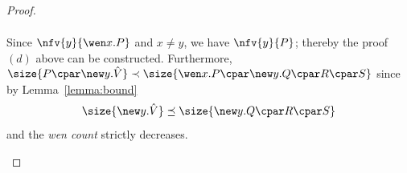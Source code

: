 \documentclass[UKenglish,acmsmall,authorversion]{acmart}
\newcommand{\fullproof}[1]{} %
\theoremstyle{plain}
\begin{document}
{\begin{proof}
\begin{enumerate}[label=\textbf{\Alph*},ref=\Alph*,leftmargin=*]
\begin{enumerate}[label*=\textbf{.\arabic*}]
\[\begin{array}{cccc}
\end{array}
\]
Since $\nfv{y}{\wen x. P}$ and $x \not= y$, we have $\nfv{y}{P}$;
thereby the proof $(d)$ above can be constructed.
Furthermore, $\size{ P \cpar \new y.\hat{V} } \prec \size{ \wen x. P \cpar \new y. Q \cpar R \cpar S }$ since by Lemma~\ref{lemma:bound} 
\[
\size{ \new y. \hat{V} } \preceq \size{\new y. Q \cpar R \cpar S}
\]
and the \textit{wen count} strictly decreases.
\end{enumerate}

\fullproof{
Consider the commutative case when the \textit{wen} quantifier commutes with another \textit{wen} quantifier at the root of the principal formula.
In this case, the bottommost rule of a proof is of the form $\wen x. P \cpar \wen y. Q \cpar R \cpar \infer[]{
S}{
 \mathopen{\wen y.} \left( \wen x. P \cpar Q \cpar R\right) \cpar S
}$, where $\nfv{y}{\wen x. P \cpar R}$ and $x \not= y$, where the second condition can be achieved by $\alpha$-conversion.
By the induction hypothesis, there exist $T$ and $U$ such that $\vdash \wen x. P \cpar Q \cpar R \cpar U$, $\nfv{y}{T}$ and either $T = U$ or $T = \new y. U$, and also
$\infer{S}{T}$.
Furthermore, the size of the proof of $\wen x. P \cpar Q \cpar R \cpar U$ is bounded above by the size of the proof of $\mathopen{\wen y.} \left( \wen x. P \cpar Q \cpar R\right) \cpar S$ and hence strictly bounded above by the size of the proof of $\wen x. P \cpar \wen y. Q \cpar R \cpar S$, enabling the induction hypothesis.
Hence, by the induction hypothesis, there exist formulae $V$ and $\hat{V}$ such that $\vdash P \cpar \hat{V}$ and $\nfv{x}{V}$ and either $V = \hat{V}$ or $V = \new x. \hat{V}$, and also $
\infer[]{
Q \cpar R \cpar U 
}{ V }$.

}
\end{enumerate}
\end{proof}}
\end{document}

